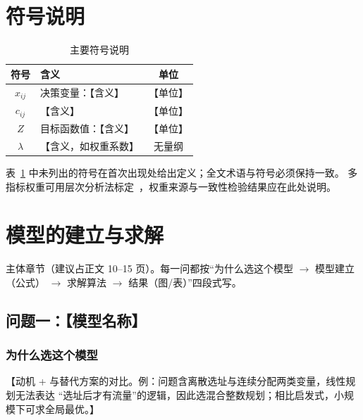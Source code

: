 \documentclass[12pt,a4paper,fontset=windows]{ctexart}
\begin{document}
\section{符号说明}
\begin{table}[htbp]
  \centering
  \caption{主要符号说明}
  \label{tab:notation}
  \begin{tabular}{clc}
    \toprule
    符号 & 含义 & 单位 \\
    \midrule
    $x_{ij}$   & 决策变量：【含义】 & 【单位】 \\
    $c_{ij}$   & 【含义】           & 【单位】 \\
    $Z$        & 目标函数值：【含义】 & 【单位】 \\
    $\lambda$  & 【含义，如权重系数】 & 无量纲 \\
    \bottomrule
  \end{tabular}
\end{table}

表~\ref{tab:notation} 中未列出的符号在首次出现处给出定义；全文术语与符号必须保持一致。
多指标权重可用层次分析法标定~\cite{saaty1980ahp}，权重来源与一致性检验结果应在此处说明。

\section{模型的建立与求解}
主体章节（建议占正文 10--15 页）。每一问都按“为什么选这个模型 $\rightarrow$ 模型建立（公式）
$\rightarrow$ 求解算法 $\rightarrow$ 结果（图/表）”四段式写。

\subsection{问题一：【模型名称】}

\subsubsection{为什么选这个模型}
【动机 + 与替代方案的对比。例：问题含离散选址与连续分配两类变量，线性规划无法表达
“选址后才有流量”的逻辑，因此选混合整数规划；相比启发式，小规模下可求全局最优。】
\end{document}
